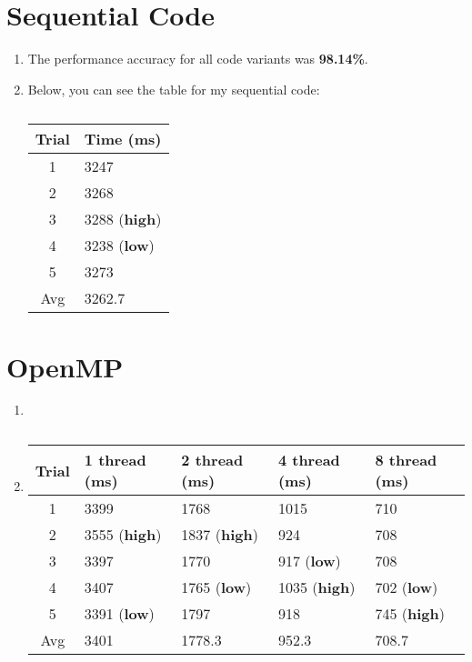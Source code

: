 \documentclass[a4paper,12pt]{article}
\theoremstyle{definition}
\theoremstyle{remark}
\begin{document}
		\section{Sequential Code}
		\begin{enumerate}
			\item The performance accuracy for all code variants was \textbf{98.14\%}.
			\item Below, you can see the table for my sequential code:
			\begin{table}[h]
				\centering
				\begin{tabular}{|c|l|}
					\hline
					\textbf{Trial}& \textbf{Time (ms)}  \\
					\hline\hline
					1&  3247 \\
					2&   3268\\
					3&   3288 (\textbf{high})\\
					4&    3238 (\textbf{low})\\
					5&    3273\\
					\hline
					Avg&  3262.7\\
					\hline
				\end{tabular}
				\label{tab:Seq}
				\caption{}
			\end{table}
		\end{enumerate}
		\section{OpenMP}
		\begin{enumerate}
			\item 	
			\item \begin{table}[h]
				\centering
				\begin{tabular}{|c|l|l|l|l|}
					\hline
					\textbf{Trial}& \textbf{1 thread (ms)}  &\textbf{2 thread (ms)}  &\textbf{4  thread (ms)}  &\textbf{8 thread (ms)}  \\
					\hline\hline
					1& 3399 & 1768 &1015  &  710\\
					2&  3555 (\textbf{high})&1837 (\textbf{high}) &924  &  708\\
					3& 3397 & 1770 & 917 (\textbf{low}) &708  \\
					4& 3407 & 1765 (\textbf{low}) & 1035 (\textbf{high}) & 702 (\textbf{low})  \\
					5& 3391 (\textbf{low}) &1797  & 918 & 745 (\textbf{high})  \\
					\hline
					Avg& 3401 &1778.3  &952.3  & 708.7 \\
					\hline
				\end{tabular}
				\label{tab:OpenMP}
				\caption{}
			\end{table}
		\end{enumerate}
		
\end{document}
